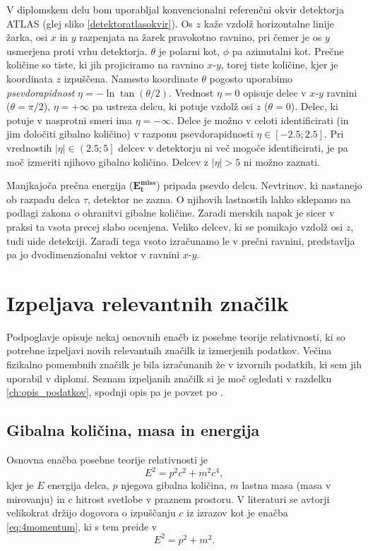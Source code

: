 \documentclass[11pt,a4paper,openany]{book}
\begin{document}
V diplomskem delu bom uporabljal konvencionalni referenčni okvir detektorja ATLAS (glej sliko \ref{detektoratlasokvir}). Os $z$ kaže vzdolž horizontalne linije žarka, osi $x$ in $y$ razpenjata na žarek pravokotno ravnino, pri čemer je os $y$ usmerjena proti vrhu detektorja. $\theta$ je polarni kot, $\phi$ pa azimutalni kot. Prečne količine so tiste, ki jih projiciramo na ravnino $x\text{-}y$, torej tiste količine, kjer je koordinata $z$ izpuščena. Namesto koordinate $\theta$ pogosto uporabimo \textit{psevdorapidnost} $\eta = -\ln \tan(\theta/2)$. Vrednost $\eta = 0$ opisuje delec v $x\text{-}y$ ravnini ($\theta = \pi/2$), $\eta = +\infty$ pa ustreza delcu, ki potuje vzdolž osi $z$ ($\theta = 0$). Delec, ki potuje v nasprotni smeri ima $\eta = -\infty$. Delce je možno v celoti identificirati (in jim določiti gibalno količino) v razponu psevdorapidnosti $\eta \in \left[-\num{2,5}; \num{2,5} \right]$. Pri vrednostih $|\eta| \in \left(\num{2,5}; 5\right]$ delcev v detektorju ni več mogoče identificirati, je pa moč izmeriti njihovo gibalno količino. Delcev z $|\eta| > 5$ ni možno zaznati.

Manjkajoča prečna energija ($\mathbf{E^{miss}_t}$) pripada psevdo delcu. Nevtrinov, ki nastanejo ob razpadu delca $\tau$, detektor ne zazna. O njihovih lastnostih lahko sklepamo na podlagi zakona o ohranitvi gibalne količine. Zaradi merskih napak je sicer v praksi ta vsota precej slabo ocenjena. Veliko delcev, ki se pomikajo vzdolž osi $z$, tudi uide detekciji. Zaradi tega vsoto izračunamo le v prečni ravnini, predstavlja pa jo dvodimenzionalni vektor v ravnini $x\text{-}y$.

\section{Izpeljava relevantnih značilk}
Podpoglavje opisuje nekaj osnovnih enačb iz posebne teorije relativnosti, ki so potrebne izpeljavi novih relevantnih značilk iz izmerjenih podatkov. Večina fizikalno pomembnih značilk je bila izračunanih že v izvornih podatkih, ki sem jih uporabil v diplomi. Seznam izpeljanih značilk si je moč ogledati v razdelku \ref{ch:opis_podatkov}, spodnji opis pa je povzet po \cite{ChallengeDoc}.

\subsection{Gibalna količina, masa in energija}
Osnovna enačba posebne teorije relativnosti je
\begin{equation}
	E^2 = p^2c^2 + m^2c^4,
	\label{eq:4momentum}
\end{equation}
kjer je $E$ energija delca, $p$ njegova gibalna količina, $m$ lastna masa (masa v mirovanju) in $c$ hitrost svetlobe v praznem prostoru. V literaturi se avtorji velikokrat držijo dogovora o izpuščanju $c$ iz izrazov kot je enačba \ref{eq:4momentum}, ki s tem preide v 
\begin{equation}
	E^2 = p^2 + m^2.
	\label{eq:4momentumsimplified}
\end{equation}
\end{document}
